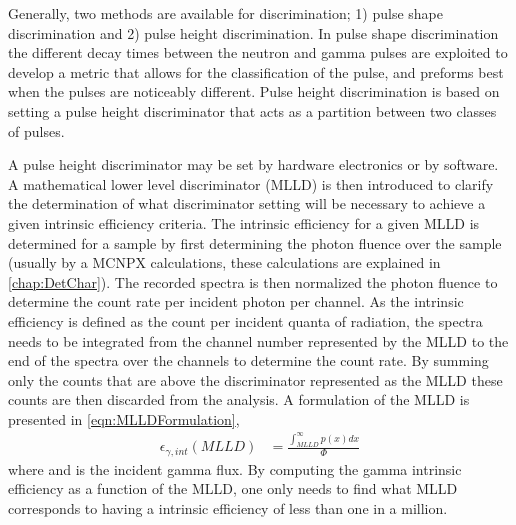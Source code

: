 Generally, two methods are available for discrimination; 1) pulse shape discrimination and 2) pulse height discrimination.
In pulse shape discrimination the different decay times between the neutron and gamma pulses are exploited to develop a metric that allows for the classification of the pulse, and preforms best when the pulses are noticeably different.
Pulse height discrimination is based on setting a pulse height discriminator that acts as a partition between two classes of pulses.

A pulse height discriminator may be set by hardware electronics or by software.
A mathematical lower level discriminator (MLLD) is then introduced to clarify the determination of what discriminator setting will be necessary to achieve a given intrinsic efficiency criteria.
The intrinsic efficiency for a given MLLD is determined for a sample by first determining the photon fluence over the sample (usually by a MCNPX calculations, these calculations are explained in \autoref{chap:DetChar}).
The recorded spectra is then normalized the photon fluence to determine the count rate per incident photon per channel.
As the intrinsic efficiency is defined as the count per incident quanta of radiation, the spectra needs to be integrated from the channel number represented by the MLLD to the end of the spectra over the channels to determine the count rate.
By summing only the counts that are above the discriminator represented as the MLLD these counts are then discarded from the analysis.
A formulation of the MLLD is presented in \eqref{eqn:MLLDFormulation},
\begin{align}
	\epsilon_{\gamma,int}\left(MLLD\right) &= \frac{\int_{MLLD}^{\infty}p(x)dx}{\Phi}
  \label{eqn:MLLDFormulation}
\end{align}
where  and  is the incident gamma flux.
By computing the gamma intrinsic efficiency as a function of the MLLD, one only needs to find what MLLD corresponds to having a intrinsic efficiency of less than one in a million.


